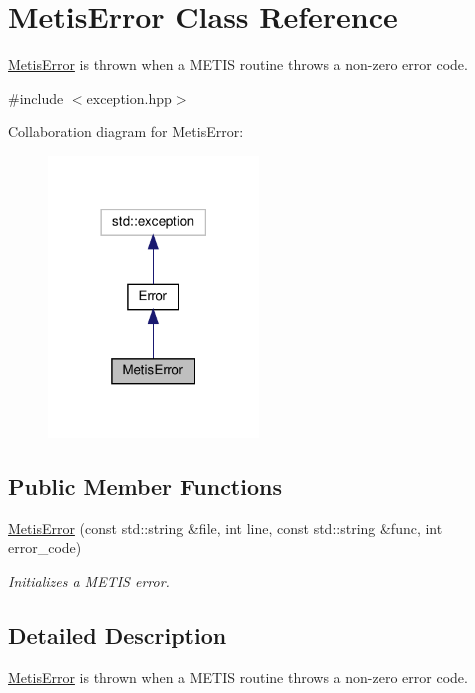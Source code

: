 \hypertarget{classMetisError}{}\section{Metis\+Error Class Reference}
\label{classMetisError}


\hyperlink{classMetisError}{Metis\+Error} is thrown when a M\+E\+T\+IS routine throws a non-\/zero error code.  




{\ttfamily \#include $<$exception.\+hpp$>$}



Collaboration diagram for Metis\+Error\+:
\nopagebreak
\begin{figure}[H]
\begin{center}
\leavevmode
\includegraphics[width=158pt]{classMetisError__coll__graph}
\end{center}
\end{figure}
\subsection*{Public Member Functions}
\begin{DoxyCompactItemize}
\item 
\hyperlink{classMetisError_ac75e70bca56efa9b432897dba8e59fda}{Metis\+Error} (const std\+::string \&file, int line, const std\+::string \&func, int error\+\_\+code)
\begin{DoxyCompactList}\small\item\em Initializes a M\+E\+T\+IS error. \end{DoxyCompactList}\end{DoxyCompactItemize}


\subsection{Detailed Description}
\hyperlink{classMetisError}{Metis\+Error} is thrown when a M\+E\+T\+IS routine throws a non-\/zero error code. 

